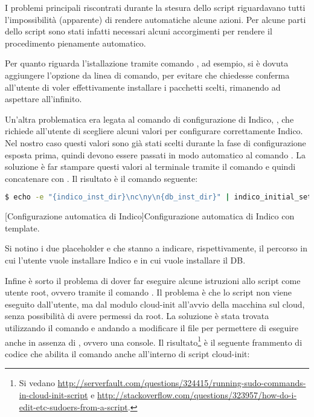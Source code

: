             I problemi principali riscontrati durante la stesura dello script riguardavano tutti l'impossibilità (apparente) di rendere automatiche alcune azioni. Per alcune parti dello script sono stati infatti necessari alcuni accorgimenti per rendere il procedimento pienamente automatico.
            
            Per quanto riguarda l'istallazione tramite comando , ad esempio, si è dovuta aggiungere l'opzione  da linea di comando, per evitare che  chiedesse conferma all'utente di voler effettivamente installare i pacchetti scelti, rimanendo ad aspettare all'infinito.
            
            Un'altra problematica era legata al comando di configurazione di Indico, , che richiede all'utente di scegliere alcuni valori per configurare correttamente Indico. Nel nostro caso questi valori sono già stati scelti durante la fase di configurazione esposta prima, quindi devono essere passati in modo automatico al comando . La soluzione è far stampare questi valori al terminale tramite il comando  e quindi concatenare  con . Il risultato è il comando seguente:
            
            \begin{center}
                \begin{lstlisting}[language=bash, gobble=18]
                    $ echo -e "{indico_inst_dir}\nc\ny\n{db_inst_dir}" | indico_initial_setup
                \end{lstlisting}
                \captionsetup{textformat=empty,labelformat=empty} \vspace{-2em}
                [Configurazione automatica di Indico]{Configurazione automatica di Indico con template.}
            \end{center}
            
            Si notino i due placeholder  e  che stanno a indicare, rispettivamente, il percorso in cui l'utente vuole installare Indico e in cui vuole installare il \ac{DB}.
            
            Infine è sorto il problema di dover far eseguire alcune istruzioni allo script come utente root, ovvero tramite il comando . Il problema è che lo script non viene eseguito dall'utente, ma dal modulo cloud-init all'avvio della macchina sul cloud, senza possibilità di avere permessi da root. La soluzione è stata trovata utilizzando il comando  e andando a modificare il file  per permettere di eseguire  anche in assenza di , ovvero una console. Il risultato\footnote{Si vedano \url{http://serverfault.com/questions/324415/running-sudo-commands-in-cloud-init-script} e \url{http://stackoverflow.com/questions/323957/how-do-i-edit-etc-sudoers-from-a-script}.} è il seguente frammento di codice che abilita il comando  anche all'interno di script cloud-init:
            
